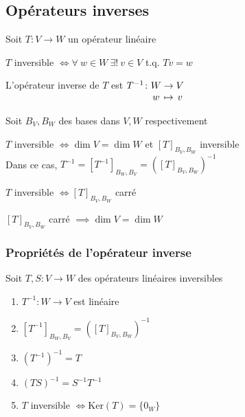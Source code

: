 
\subsection{Opérateurs inverses}
Soit $T\colon V \to W$ un opérateur linéaire
\begin{definition}
    $T$ inversible $\iff \forall \ w \in W \ \exists! \ v \in V$ t.q. $Tv = w$
\end{definition}
\begin{definition}
    L'opérateur inverse de $T$ est $\myfunc{T^{-1}}{W}{V}{w}{v}$ 
\end{definition}
Soit $B_V, B_W$ des bases dans $V, W$ respectivement 
\begin{theorem}
    $T$ inversible $\iff \dim V = \dim W$ et $[T]_{B_V, B_W}$ inversible \\
    Dans ce cas, $T^{-1} = [T^{-1}]_{B_W, B_V} = \left([T]_{B_V, B_W}\right)^{-1}$
\end{theorem}
\begin{corollary}
    $T$ inversible $\iff [T]_{B_V, B_W}$ carré
\end{corollary}
\begin{remark}
    $[T]_{B_V, B_W}$ carré $\implies \dim V = \dim W$
\end{remark}

\subsubsection{Propriétés de l'opérateur inverse}
Soit $T, S\colon V \to W$ des opérateurs linéaires inversibles
\begin{enumerate}
    \item $T^{-1}\colon W \to V$ est linéaire
    \item $[T^{-1}]_{B_W, B_V} = \left([T]_{B_V, B_W}\right)^{-1}$
    \item $\left(T^{-1}\right)^{-1} = T$
    \item $(TS)^{-1} = S^{-1}T^{-1}$
    \item $T$ inversible $\iff \text{Ker}(T) = \{0_W\}$
\end{enumerate}

